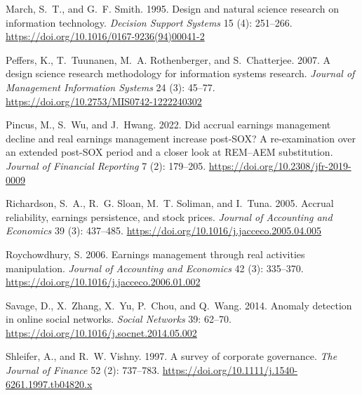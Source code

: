 \documentclass[12pt]{article}
\begin{document}
\begin{thebibliography}{}
March, S.~T., and G.~F. Smith. 1995.
\newblock Design and natural science research on information technology.
\newblock \textit{Decision Support Systems} 15 (4): 251--266.
  \url{https://doi.org/10.1016/0167-9236(94)00041-2}

Peffers, K., T.~Tuunanen, M.~A. Rothenberger, and S.~Chatterjee. 2007.
\newblock A design science research methodology for information systems
  research.
\newblock \textit{Journal of Management Information Systems} 24 (3): 45--77.
  \url{https://doi.org/10.2753/MIS0742-1222240302}

Pincus, M., S.~Wu, and J.~Hwang. 2022.
\newblock Did accrual earnings management decline and real earnings management
  increase post-SOX? A re-examination over an extended post-SOX period and a
  closer look at REM--AEM substitution.
\newblock \textit{Journal of Financial Reporting} 7 (2): 179--205.
  \url{https://doi.org/10.2308/jfr-2019-0009}

Richardson, S.~A., R.~G. Sloan, M.~T. Soliman, and I.~Tuna. 2005.
\newblock Accrual reliability, earnings persistence, and stock prices.
\newblock \textit{Journal of Accounting and Economics} 39 (3): 437--485.
  \url{https://doi.org/10.1016/j.jacceco.2005.04.005}

Roychowdhury, S. 2006.
\newblock Earnings management through real activities manipulation.
\newblock \textit{Journal of Accounting and Economics} 42 (3): 335--370.
  \url{https://doi.org/10.1016/j.jacceco.2006.01.002}

Savage, D., X.~Zhang, X.~Yu, P.~Chou, and Q.~Wang. 2014.
\newblock Anomaly detection in online social networks.
\newblock \textit{Social Networks} 39: 62--70.
  \url{https://doi.org/10.1016/j.socnet.2014.05.002}

Shleifer, A., and R.~W. Vishny. 1997.
\newblock A survey of corporate governance.
\newblock \textit{The Journal of Finance} 52 (2): 737--783.
  \url{https://doi.org/10.1111/j.1540-6261.1997.tb04820.x}


\end{thebibliography}
\end{document}
